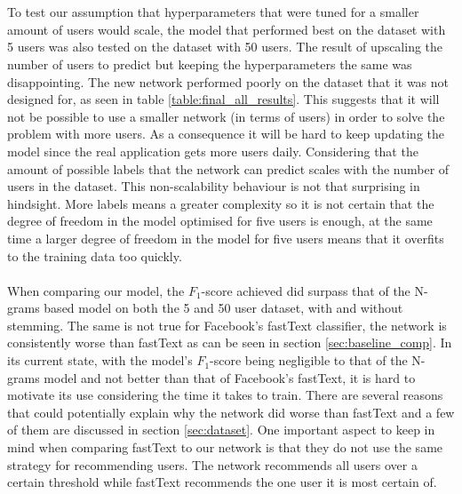 \\\\
To test our assumption that hyperparameters that were tuned for a smaller amount of users would scale, the model that performed best on the dataset with 5 users was also tested on the dataset with 50 users. The result of upscaling the number of users to predict but keeping the hyperparameters the same was disappointing. The new network performed poorly on the dataset that it was not designed for, as seen in table \ref{table:final_all_results}. This suggests that it will not be possible to use a smaller network (in terms of users) in order to solve the problem with more users. As a consequence it will be hard to keep updating the model since the real application gets more users daily. Considering that the amount of possible labels that the network can predict scales with the number of users in the dataset. This non-scalability behaviour is not that surprising in hindsight. More labels means a greater complexity so it is not certain that the degree of freedom in the model optimised for five users is enough, at the same time a larger degree of freedom in the model for five users means that it overfits to the training data too quickly.
\\\\
When comparing our model, the $F_1$-score achieved did surpass that of the N-grams based model on both the 5 and 50 user dataset, with and without stemming. The same is not true for Facebook's fastText classifier, the network is consistently worse than fastText as can be seen in section \ref{sec:baseline_comp}. In its current state, with the model's $F_1$-score being negligible to that of the N-grams model and not better than that of Facebook's fastText, it is hard to motivate its use considering the time it takes to train. There are several reasons that could potentially explain why the network did worse than fastText and a few of them are discussed in section \ref{sec:dataset}. One important aspect to keep in mind when comparing fastText to our network is that they do not use the same strategy for recommending users. The network recommends all users over a certain threshold while fastText recommends the one user it is most certain of.

